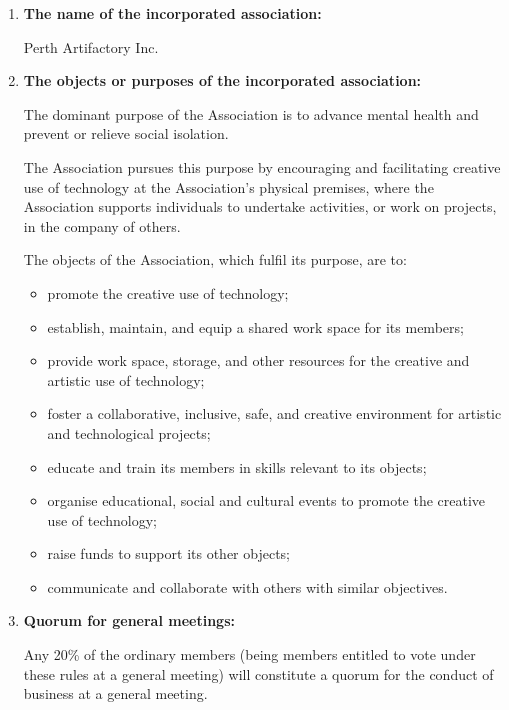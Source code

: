 \documentclass[../constitution.tex]{subfiles}
\begin{document}
 \label{key-information}

\begin{enumerate}[label=\Alph*.]
  \item \textbf{The name of the incorporated association:} \label{key-info-name-of-association}
  
  Perth Artifactory Inc.
  
  \item \textbf{The objects or purposes of the incorporated association:} \label{key-info-objects-purposes}
  



  The dominant purpose of the Association is to advance mental health and prevent or relieve social isolation.

  The Association pursues this purpose by encouraging and facilitating creative use of technology at the Association's physical premises, where the Association supports individuals to undertake activities, or work on projects, in the company of others.
  
  The objects of the Association, which fulfil its purpose, are to:


    \begin{itemize}
    \item promote the creative use of technology;
    \item establish, maintain, and equip a shared work space for its members;
    \item provide work space, storage, and other resources for the creative and artistic use of technology;
    \item foster a collaborative, inclusive, safe, and creative environment for artistic and technological projects;
    \item educate and train its members in skills relevant to its objects;
    \item organise educational, social and cultural events to promote the creative use of technology;
    \item raise funds to support its other objects;
    \item communicate and collaborate with others with similar objectives.
    \end{itemize}
  
  \item \textbf{Quorum for general meetings:} \label{key-info-quorum-for-general-meetings}
  
  Any 20\% of the ordinary members (being members entitled to vote under these rules at a general meeting) will constitute a quorum for the conduct of business at a general meeting.


\end{enumerate}
\end{document}
